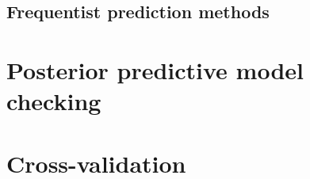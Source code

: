 \documentclass[12pt, letterpaper]{article}
\begin{document}


\subsection{Frequentist prediction methods}

\section{Posterior predictive model checking}

\section{Cross-validation}


\printbibliography
\end{document}
